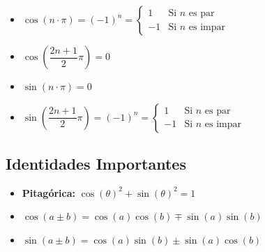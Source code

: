 \documentclass[12pt, fleqn]{report}                             %
\theoremstyle{break}                                            %
\newcommand{\Wrap}[1]           {\left( #1 \right)}             %
\newcommand{\Cos}[1] {\cos\Wrap{#1}}                            %
\newcommand{\Sin}[1] {\sin\Wrap{#1}}                            %
\begin{document}
                \begin{itemize}
                    \item
                        $
                            \Cos{n \cdot \pi} 
                            =
                            (-1)^n  
                            =
                            \begin{cases}
                                1 & \text{Si $n$ es par}      \\
                                -1 & \text{Si $n$ es impar}
                            \end{cases} 
                        $                        

                    \item $\Cos{\dfrac{2n+1}{2} \pi } = 0$

                    \item $\Sin{n \cdot \pi} = 0$

                    \item
                        $
                            \Sin{\dfrac{2n+1}{2} \pi }
                            =
                            (-1)^n  
                            =
                            \begin{cases}
                                1 & \text{Si $n$ es par}      \\
                                -1 & \text{Si $n$ es impar}
                            \end{cases}
                        $
                \end{itemize}




            \subsection{Identidades Importantes}

                \begin{itemize}
                    \item
                        \textbf{Pitagórica: } $\Cos{\theta}^2 + \Sin{\theta}^2 = 1$

                    \item 
                        $\Cos{a \pm b } = \Cos{a}\Cos{b} \mp \Sin{a}\Sin{b}$

                    \item
                        $\Sin{a \pm b } = \Cos{a}\Sin{b} \pm \Sin{a}\Cos{b}$

                \end{itemize}
\end{document}
